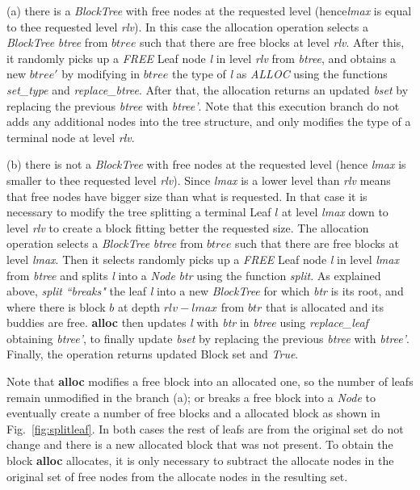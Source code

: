 (a) there is a \emph{BlockTree} with free nodes at the requested level (hence\emph{lmax} is equal to thee requested level \emph{rlv}). In this case the allocation operation selects a \emph{BlockTree} \emph{btree} from $btree$ such that there are free blocks at level \emph{rlv}. After this, it randomly picks up a \emph{FREE} Leaf node \emph{l} in level \emph{rlv} from \emph{btree}, and obtains a new $btree'$ by modifying in $btree$ the type of \emph{l} as \emph{ALLOC} using the functions \emph{set\_type} and \emph{replace\_btree}. After that, the allocation returns an updated \emph{bset} by replacing the previous \emph{btree} with \emph{btree'}. Note that this execution branch do not adds any additional nodes into the tree structure, and only modifies the type of a terminal node at level \emph{rlv}.

(b) there is not a \emph{BlockTree} with free nodes at the requested level (hence \emph{lmax} is smaller to thee requested level \emph{rlv}). Since  \emph{lmax} is a lower level than \emph{rlv} means that free nodes have bigger size than what is requested. In that case it is necessary to modify the tree splitting a terminal Leaf $l$ at level \emph{lmax} down to level \emph{rlv} to create a block fitting better the requested size. The allocation operation selects a \emph{BlockTree} \emph{btree} from $btree$ such that there are free blocks at level \emph{lmax}. Then it selects randomly picks up a \emph{FREE} Leaf node \emph{l} in level \emph{lmax} from \emph{btree} and splits \emph{l} into a \emph{Node} \emph{btr} using the function \emph{split}. As explained above, \emph{split} \emph{``breaks"} the leaf \emph{l} into a new \emph{BlockTree} for which \emph{btr} is its root, and where there is block $b$ at depth $rlv - lmax$ from $btr$ that is allocated and its buddies are free. \textbf{alloc} then updates \emph{l} with \emph{btr} in  \emph{btree} using \emph{replace\_leaf} obtaining \emph{btree'}, to finally update \emph{bset} by replacing the previous \emph{btree} with \emph{btree'}. Finally, the operation returns updated Block set and \emph{True}.

Note that \textbf{alloc} modifies a free block into an allocated one, so the number of leafs remain unmodified in the branch (a); or breaks a free block into a \emph{Node} to eventually create a number of free blocks and a allocated block as shown in Fig.~\ref{fig:splitleaf}. In both cases the rest of leafs are from the original set do not change and there is a new allocated block that was not present. To obtain the block \textbf{alloc} allocates, it is only necessary to subtract the allocate nodes in the original set of free nodes from the allocate nodes in the resulting set.

